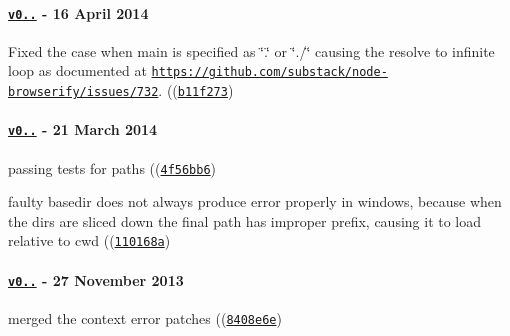\paragraph*{\href{https://github.com/browserify/resolve/compare/v0.6.2...v0.6.3}{\tt v0..} -\/ 16 April 2014}


\begin{DoxyItemize}
\item Fixed the case when main is specified as \char`\"{}.\char`\"{} or \char`\"{}./\char`\"{} causing the resolve to infinite loop as documented at \href{https://github.com/substack/node-browserify/issues/732}{\tt https\+://github.\+com/substack/node-\/browserify/issues/732}. ((\href{https://github.com/browserify/resolve/commit/b11f2739ad8c9730e1076271eff54850755e2ee1}{\tt {\ttfamily b11f273}})
\end{DoxyItemize}

\paragraph*{\href{https://github.com/browserify/resolve/compare/v0.6.1...v0.6.2}{\tt v0..} -\/ 21 March 2014}


\begin{DoxyItemize}
\item passing tests for paths ((\href{https://github.com/browserify/resolve/commit/4f56bb67fa45d35adfa6a0022cc77afbf8117234}{\tt {\ttfamily 4f56bb6}})
\item faulty basedir does not always produce error properly in windows, because when the dirs are sliced down the final path has improper prefix, causing it to load relative to cwd ((\href{https://github.com/browserify/resolve/commit/110168adae1dfbedcb9a12086cacf0ce68cc67f6}{\tt {\ttfamily 110168a}})
\end{DoxyItemize}

\paragraph*{\href{https://github.com/browserify/resolve/compare/v0.6.0...v0.6.1}{\tt v0..} -\/ 27 November 2013}


\begin{DoxyItemize}
\item merged the context error patches ((\href{https://github.com/browserify/resolve/commit/8408e6e8902b4bec8c859d606f53366e42058378}{\tt {\ttfamily 8408e6e}})
\end{DoxyItemize}

